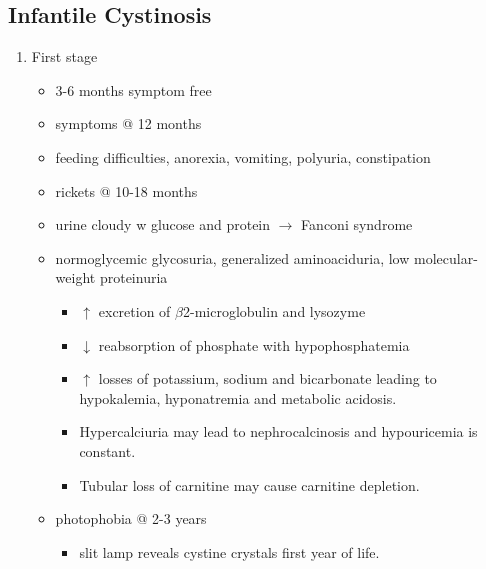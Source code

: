 \documentclass{scrartcl}
\begin{document}
\subsection{Infantile Cystinosis}
\label{sec:org20add80}
\begin{enumerate}
\item First stage
\label{sec:org0e43653}
\begin{itemize}
\item 3-6 months symptom free
\item symptoms @ 12 months
\item feeding difficulties, anorexia, vomiting, polyuria, constipation
\item rickets @ 10-18 months
\item urine cloudy w glucose and protein \(\to\) Fanconi syndrome
\item normoglycemic glycosuria, generalized aminoaciduria, low
molecular-weight proteinuria
\begin{itemize}
\item \(\uparrow\) excretion of \(\beta\)2-microglobulin and lysozyme
\item \(\downarrow\) reabsorption of phosphate with hypophosphatemia
\item \(\uparrow\) losses of potassium, sodium and bicarbonate leading to
hypokalemia, hyponatremia and metabolic acidosis.
\item Hypercalciuria may lead to nephrocalcinosis and hypouricemia is constant.
\item Tubular loss of carnitine may cause carnitine depletion.
\end{itemize}
\item photophobia @ 2-3 years
\begin{itemize}
\item slit lamp reveals cystine crystals first year of life.
\end{itemize}
\end{itemize}


\end{enumerate}
\end{document}

